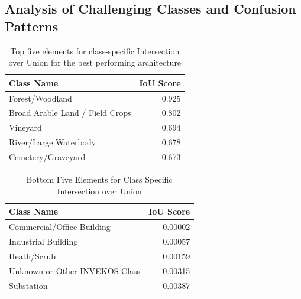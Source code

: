 \documentclass{report}
\begin{document}
\subsection{Analysis of Challenging Classes and Confusion Patterns}
\label{sec:analysis_challenge_class_confusion}
\begin{table}[H]
\centering
\caption{Top five elements for class-specific Intersection over Union for the best performing architecture}
\label{tab:class_specific_iou_best}
\begin{tabular}{lr}
\toprule
Class Name & IoU Score \\
\midrule
Forest/Woodland & 0.925 \\
Broad Arable Land / Field Crops & 0.802 \\
Vineyard & 0.694 \\
River/Large Waterbody & 0.678 \\
Cemetery/Graveyard & 0.673 \\
\bottomrule
\end{tabular}
\end{table}


\begin{table}[H]
\centering
\caption{Bottom Five Elements for Class Specific Intersection over Union}
\label{tab:class_specific_iou_worst}
\begin{tabular}{lr}
\toprule
Class Name & IoU Score \\
\midrule
Commercial/Office Building & 0.00002 \\
Industrial Building & 0.00057 \\
Heath/Scrub & 0.00159 \\
Unknown or Other INVEKOS Class & 0.00315 \\
Substation & 0.00387 \\
\bottomrule
\end{tabular}
\end{table}
\end{document}
